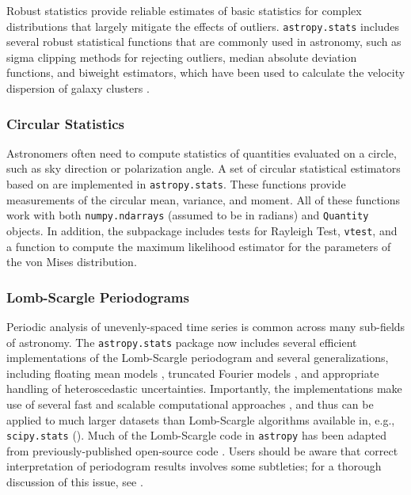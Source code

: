 \documentclass[modern]{aastex62}
\newcommand{\package}[1]{\texttt{#1}\xspace}
\newcommand{\astropypkg}{\package{astropy}}
\begin{document}
Robust statistics provide reliable estimates of basic statistics for complex
distributions that largely mitigate the effects of outliers.
\package{astropy.stats} includes several robust statistical functions that are
commonly used in astronomy, such as sigma clipping methods for rejecting
outliers, median absolute deviation functions, and biweight estimators,
which have been used to calculate the velocity dispersion of galaxy clusters
\citep{Beers1990}.

\subsubsection{Circular Statistics}

Astronomers often need to compute statistics of quantities evaluated on a
circle, such as sky direction or polarization angle.
A set of circular statistical estimators based on \citet{JammalamadakaSengupta}
are implemented in \package{astropy.stats}.  These functions provide
measurements of the circular mean, variance, and moment.   All of these
functions work with both \texttt{numpy.ndarrays} (assumed to be in radians) and
\texttt{Quantity} objects.  In addition, the subpackage includes
tests for Rayleigh Test, \texttt{vtest}, and a function to compute the maximum
likelihood estimator for the parameters of the von Mises distribution.

\subsubsection{Lomb-Scargle Periodograms}

Periodic analysis of unevenly-spaced time series is common across many
sub-fields of astronomy. The \package{astropy.stats} package now includes
several efficient implementations of the Lomb-Scargle periodogram
\citep{Lomb76, Scargle82} and several generalizations, including floating mean
models \citep{Zechmeister09}, truncated Fourier models \citep{Bretthorst2003},
and appropriate handling of heteroscedastic uncertainties.
Importantly, the implementations make use of several fast and scalable
computational approaches \citep[e.g.,][]{Press89, Palmer09}, and thus can be
applied to much larger datasets than Lomb-Scargle algorithms available in,
e.g., \package{scipy.stats} (\citealt{scipy}). Much of the Lomb-Scargle code
in \astropypkg has been adapted from previously-published open-source code
\citep{astroML, VanderPlas2015}. Users should be aware that correct
interpretation of periodogram results involves some subtleties; for a thorough
discussion of this issue, see \citet[][in press]{VanderPlas2018}.
\end{document}
